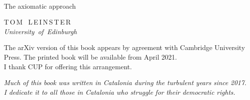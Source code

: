 \thispagestyle{empty}

{\centering
\vspace*{20mm}

\\[3mm]
{\huge The axiomatic approach}

\vspace*{14mm}

{\large T\,O\,M \, L\,E\,I\,N\,S\,T\,E\,R}\\
\textit{University \,of \,Edinburgh}

\vfill


\begin{center}
\parbox{1\textwidth}{
\centering\large 
The arXiv version of this book appears by agreement with Cambridge
University Press. The printed book will be available from April 2021.\\
I thank CUP for offering this arrangement.
}
\end{center}

}



\newpage

\thispagestyle{empty}

{\centering
\mbox{}
\vfill
\large 
\parbox{80mm}{\centering\itshape%
Much of this book was written in Catalonia
  during the turbulent years since 2017.  I dedicate it to all
  those in Catalonia who struggle for their democratic rights.}  
% 
\vfill
\mbox{}}
